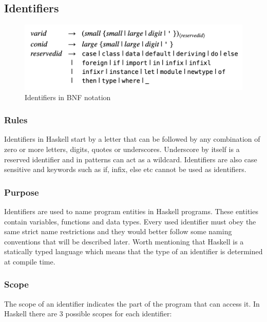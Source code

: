\documentclass[a4paper, titlepage, twoside]{article}
\begin{document}
\subsection{Identifiers}
\label{sec:orgad3f39e}

\begin{figure}[htbp]
\centering
\includegraphics[width=.9\linewidth]{img/2023-05-22_21-55-01_screenshot.png}
\caption{Identifiers in BNF notation \autocite[section 2.4]{marlowHaskell2010Language2010}}
\end{figure}


\subsubsection{Rules}
\label{sec:org248f21e}

Identifiers in Haskell start by a letter that can be followed by any combination of zero or more letters, digits, quotes or underscores.  Underscore by itself is a reserved identifier and in patterns can act as a wildcard. Identifiers are also case sensitive and keywords such as if, infix, else etc cannot be used as identifiers.

\subsubsection{Purpose}
\label{sec:org014126f}

Identifiers are used to name program entities in Haskell programs. These entities contain variables, functions and data types. Every used identifier must obey the same strict name restrictions and they would better follow some naming conventions that will be described later.  Worth mentioning that Haskell is a statically typed language which means that the type of an identifier is determined at compile time.

\subsubsection{Scope}
\label{sec:org8775a0f}

The scope of an identifier indicates the part of the program that can access it. In Haskell there are 3 possible scopes for each identifier:
\end{document}
